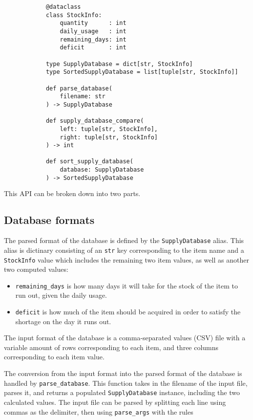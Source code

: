 \documentclass{article}
\begin{document}
		\begin{verbatim}
			@dataclass
			class StockInfo:
				quantity      : int
				daily_usage   : int
				remaining_days: int
				deficit       : int

			type SupplyDatabase = dict[str, StockInfo]
			type SortedSupplyDatabase = list[tuple[str, StockInfo]]

			def parse_database(
				filename: str
			) -> SupplyDatabase

			def supply_database_compare(
				left: tuple[str, StockInfo],
				right: tuple[str, StockInfo]
			) -> int

			def sort_supply_database(
				database: SupplyDatabase
			) -> SortedSupplyDatabase
		\end{verbatim}

		This API can be broken down into two parts.

		\subsection{Database formats}
			The parsed format of the database is defined by the \verb|SupplyDatabase| alias. This
			alias is dictinary consisting of an \verb|str| key corresponding to the item name and a
			\verb|StockInfo| value which includes the remaining two item values, as well as another
			two computed values:

			\begin{itemize}
				\item \verb|remaining_days| is how many days it will take for the stock of the item
				to run out, given the daily usage.
				\item \verb|deficit| is how much of the item should be acquired in order to satisfy
				the shortage on the day it runs out.
			\end{itemize}

			The input format of the database is a comma-separated values (CSV) file with a variable
			amount of rows corresponding to each item, and three columns corresponding to each item
			value.

			The conversion from the input format into the parsed format of the database is handled
			by \verb|parse_database|. This function takes in the filename of the input file, parses
			it, and returns a populated \verb|SupplyDatabase| instance, including the two
			calculated values. The input file can be parsed by splitting each line using commas as
			the delimiter, then using \verb|parse_args| with the rules
\end{document}

